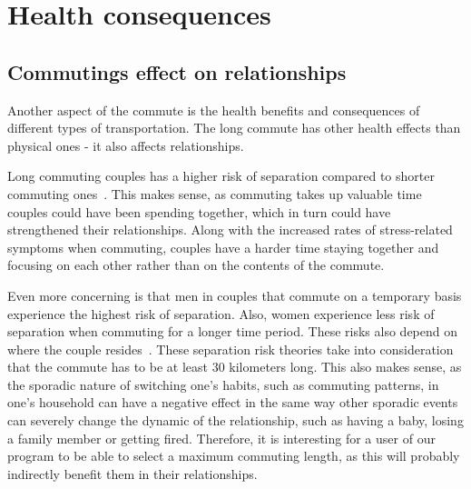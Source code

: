 \section{Health consequences}\label{sec:health-consequences}


\subsection{Commutings effect on relationships}\label{subsec:commutings-effect-on-relationships}

Another aspect of the commute is the health benefits and consequences of different types of transportation.
The long commute has other health effects than physical ones - it also affects relationships.

Long commuting couples has a higher risk of separation compared to shorter commuting ones~\cite{sandow2011}.
This makes sense, as commuting takes up valuable time couples could have been spending together, which in turn could
have strengthened their relationships.
Along with the increased rates of stress-related symptoms when commuting, couples have a harder time staying together
and focusing on each other rather than on the contents of the commute.

Even more concerning is that men in couples that commute on a temporary basis experience the highest risk of separation.
Also, women experience less risk of separation when commuting for a longer time period.
These risks also depend on where the couple resides~\cite{sandow2011}.
These separation risk theories take into consideration that the commute has to be at least 30 kilometers long.
This also makes sense, as the sporadic nature of switching one's habits, such as commuting patterns, in one's household
can have a negative effect in the same way other sporadic events can severely change the dynamic of the relationship,
such as having a baby, losing a family member or getting fired.
Therefore, it is interesting for a user of our program to be able to select a maximum commuting length, as this will
probably indirectly benefit them in their relationships.



